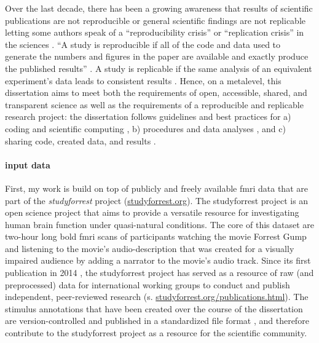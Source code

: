 Over the last decade, there has been a growing awareness that results of
scientific publications are not reproducible or general scientific findings are
not replicable letting some authors speak of a ``reproducibility crisis'' or
``replication crisis'' in the sciences \citep{baker2016reproducibility,
plesser2018reproducibility, stupple2019reproducibility, nosek2022replicability}.
``A study is reproducible if all of the code and data used to generate the
numbers and figures in the paper are available and exactly produce the published
results'' \citep{leek2017most}.
A study is replicable if the same analysis of an equivalent experiment's data
leads to consistent results \citep{dubois2016building, leek2017most}.
%
Hence, on a metalevel, this dissertation aims to meet both the requirements of
open, accessible, shared, and transparent science \citep{watson2015will,
fecher2014open} as well as the requirements of a reproducible and replicable
research project:
%
the dissertation follows guidelines and best practices for a) coding and
scientific computing \citep{wilson2014best}, b) procedures and data analyses
\citep{nichols2017best, poldrack2017scanning, poldrack2019establishment}, and c)
sharing code, created data, and results \citep{eglen2017toward, nichols2017best,
pernet2015improving}.


\paragraph{input data}

First, my work is build on top of publicly and freely available \ac{fmri} data
that are part of the \textit{studyforrest} project
(\href{www.studyforrest.org}{studyforrest.org}).
%
The studyforrest project is an open science project that aims to provide a
versatile resource for investigating human brain function under quasi-natural
conditions.
%
The core of this dataset are two-hour long \ac{bold} \ac{fmri} scans of
participants watching the movie Forrest Gump \citep{ForrestGumpMovie} and
listening to the movie's audio-description that was created for a visually
impaired audience by adding a narrator to the movie's audio track.
%
Since its first publication in 2014 \citep{hanke2014audiomovie}, the
studyforrest project has served as a resource of raw (and preprocessed) data for
international working groups to conduct and publish independent, peer-reviewed
research (s.
\href{www.studyforrest.org/publications.html}{studyforrest.org/publications.html}).
%
The stimulus annotations that have been created over the course of the
dissertation are version-controlled and published in a standardized file format
\citep{haeusler2021speechanno}, and therefore contribute to the studyforrest
project as a resource for the scientific community.


